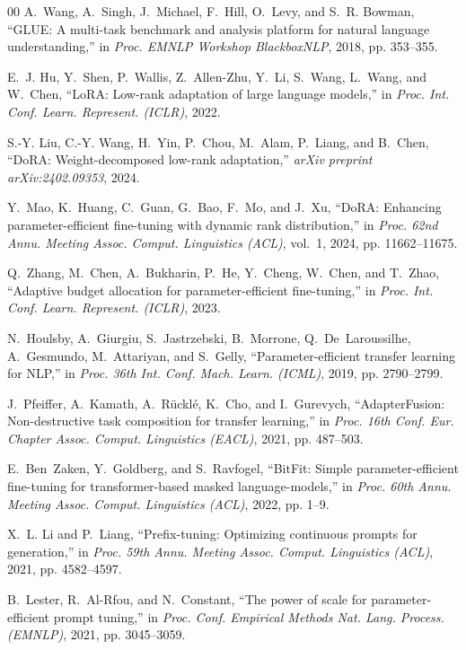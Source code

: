 \documentclass[conference]{IEEEtran}
\begin{document}
\begin{thebibliography}{00}
A.~Wang, A.~Singh, J.~Michael, F.~Hill, O.~Levy, and S.~R. Bowman, ``GLUE: A multi-task benchmark and analysis platform for natural language understanding,'' in \emph{Proc. EMNLP Workshop BlackboxNLP}, 2018, pp. 353--355.

E.~J. Hu, Y.~Shen, P.~Wallis, Z.~Allen-Zhu, Y.~Li, S.~Wang, L.~Wang, and W.~Chen, ``LoRA: Low-rank adaptation of large language models,'' in \emph{Proc. Int. Conf. Learn. Represent. (ICLR)}, 2022.

S.-Y. Liu, C.-Y. Wang, H.~Yin, P.~Chou, M.~Alam, P.~Liang, and B.~Chen, ``DoRA: Weight-decomposed low-rank adaptation,'' \emph{arXiv preprint arXiv:2402.09353}, 2024.

Y.~Mao, K.~Huang, C.~Guan, G.~Bao, F.~Mo, and J.~Xu, ``DoRA: Enhancing parameter-efficient fine-tuning with dynamic rank distribution,'' in \emph{Proc. 62nd Annu. Meeting Assoc. Comput. Linguistics (ACL)}, vol.~1, 2024, pp. 11662--11675.

Q.~Zhang, M.~Chen, A.~Bukharin, P.~He, Y.~Cheng, W.~Chen, and T.~Zhao, ``Adaptive budget allocation for parameter-efficient fine-tuning,'' in \emph{Proc. Int. Conf. Learn. Represent. (ICLR)}, 2023.

N.~Houlsby, A.~Giurgiu, S.~Jastrzebski, B.~Morrone, Q.~De~Laroussilhe, A.~Gesmundo, M.~Attariyan, and S.~Gelly, ``Parameter-efficient transfer learning for NLP,'' in \emph{Proc. 36th Int. Conf. Mach. Learn. (ICML)}, 2019, pp. 2790--2799.

J.~Pfeiffer, A.~Kamath, A.~R{\"u}ckl{\'e}, K.~Cho, and I.~Gurevych, ``AdapterFusion: Non-destructive task composition for transfer learning,'' in \emph{Proc. 16th Conf. Eur. Chapter Assoc. Comput. Linguistics (EACL)}, 2021, pp. 487--503.

E.~Ben~Zaken, Y.~Goldberg, and S.~Ravfogel, ``BitFit: Simple parameter-efficient fine-tuning for transformer-based masked language-models,'' in \emph{Proc. 60th Annu. Meeting Assoc. Comput. Linguistics (ACL)}, 2022, pp. 1--9.

X.~L. Li and P.~Liang, ``Prefix-tuning: Optimizing continuous prompts for generation,'' in \emph{Proc. 59th Annu. Meeting Assoc. Comput. Linguistics (ACL)}, 2021, pp. 4582--4597.

B.~Lester, R.~Al-Rfou, and N.~Constant, ``The power of scale for parameter-efficient prompt tuning,'' in \emph{Proc. Conf. Empirical Methods Nat. Lang. Process. (EMNLP)}, 2021, pp. 3045--3059.


\end{thebibliography}
\end{document}
